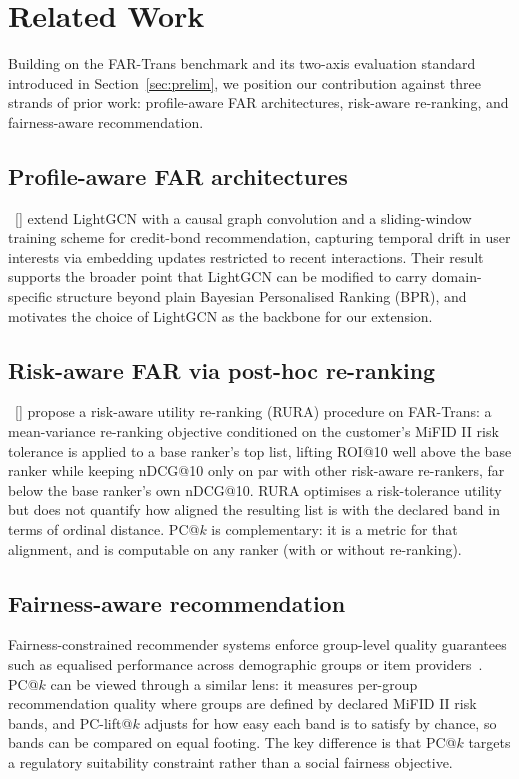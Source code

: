 \section{Related Work}
\label{sec:relatedwork}

Building on the FAR-Trans benchmark and its two-axis evaluation standard introduced in Section~\ref{sec:prelim}, we position our contribution against three strands of prior work: profile-aware FAR architectures, risk-aware re-ranking, and fairness-aware recommendation.

\subsection{Profile-aware FAR architectures}
\citeauthor{Ghiye_2024}~[\citeyear{Ghiye_2024}] extend LightGCN with a causal graph convolution and a sliding-window training scheme for credit-bond recommendation, capturing temporal drift in user interests via embedding updates restricted to recent interactions. Their result supports the broader point that LightGCN can be modified to carry domain-specific structure beyond plain Bayesian Personalised Ranking (BPR), and motivates the choice of LightGCN as the backbone for our extension.

\subsection{Risk-aware FAR via post-hoc re-ranking}
\citeauthor{10.1145/3773966.3779383}~[\citeyear{10.1145/3773966.3779383}] propose a risk-aware utility re-ranking (RURA) procedure on FAR-Trans: a mean-variance re-ranking objective conditioned on the customer's MiFID II risk tolerance is applied to a base ranker's top list, lifting ROI@10 well above the base ranker while keeping nDCG@10 only on par with other risk-aware re-rankers, far below the base ranker's own nDCG@10. RURA optimises a risk-tolerance utility but does not quantify how aligned the resulting list is with the declared band in terms of ordinal distance. PC@$k$ is complementary: it is a metric for that alignment, and is computable on any ranker (with or without re-ranking).

\subsection{Fairness-aware recommendation}
Fairness-constrained recommender systems enforce group-level quality guarantees such as equalised performance across demographic groups or item providers~\cite{zhao2024fairnessdiversityrecommendersystems}. PC@$k$ can be viewed through a similar lens: it measures per-group recommendation quality where groups are defined by declared MiFID II risk bands, and PC-lift@$k$ adjusts for how easy each band is to satisfy by chance, so bands can be compared on equal footing. The key difference is that PC@$k$ targets a regulatory suitability constraint rather than a social fairness objective.

